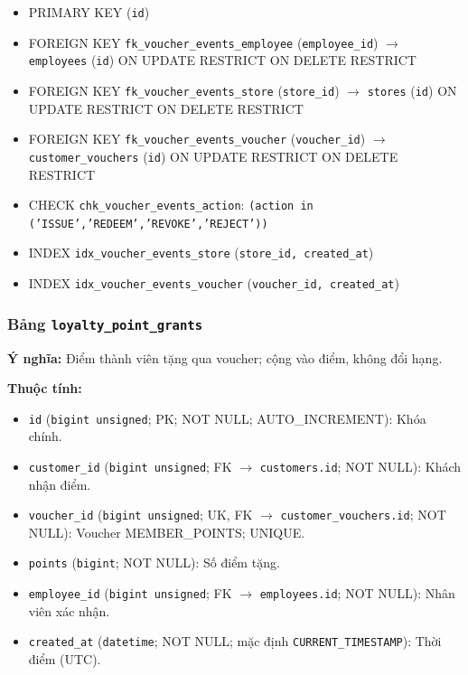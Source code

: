 \begin{itemize}

\item PRIMARY KEY (\texttt{id})

\item FOREIGN KEY \texttt{fk\_voucher\_events\_employee} (\texttt{employee\_id}) $\rightarrow$ \texttt{employees} (\texttt{id}) ON UPDATE RESTRICT ON DELETE RESTRICT

\item FOREIGN KEY \texttt{fk\_voucher\_events\_store} (\texttt{store\_id}) $\rightarrow$ \texttt{stores} (\texttt{id}) ON UPDATE RESTRICT ON DELETE RESTRICT

\item FOREIGN KEY \texttt{fk\_voucher\_events\_voucher} (\texttt{voucher\_id}) $\rightarrow$ \texttt{customer\_vouchers} (\texttt{id}) ON UPDATE RESTRICT ON DELETE RESTRICT

\item CHECK \texttt{chk\_voucher\_events\_action}: \texttt{(action in ('ISSUE','REDEEM','REVOKE','REJECT'))}

\item INDEX \texttt{idx\_voucher\_events\_store} (\texttt{store\_id, created\_at})

\item INDEX \texttt{idx\_voucher\_events\_voucher} (\texttt{voucher\_id, created\_at})

\end{itemize}

\subsubsection{Bảng \texttt{loyalty\_point\_grants}}

\textbf{Ý nghĩa:} Điểm thành viên tặng qua voucher; cộng vào điểm, không đổi hạng.\par

\textbf{Thuộc tính:}

\begin{itemize}

\item \texttt{id} (\texttt{bigint unsigned}; PK; NOT NULL; AUTO_INCREMENT): Khóa chính.

\item \texttt{customer\_id} (\texttt{bigint unsigned}; FK $\rightarrow$ \texttt{customers.id}; NOT NULL): Khách nhận điểm.

\item \texttt{voucher\_id} (\texttt{bigint unsigned}; UK, FK $\rightarrow$ \texttt{customer\_vouchers.id}; NOT NULL): Voucher MEMBER_POINTS; UNIQUE.

\item \texttt{points} (\texttt{bigint}; NOT NULL): Số điểm tặng.

\item \texttt{employee\_id} (\texttt{bigint unsigned}; FK $\rightarrow$ \texttt{employees.id}; NOT NULL): Nhân viên xác nhận.

\item \texttt{created\_at} (\texttt{datetime}; NOT NULL; mặc định \texttt{CURRENT\_TIMESTAMP}): Thời điểm (UTC).

\end{itemize}

